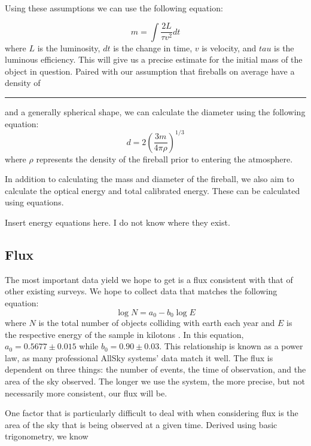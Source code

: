 Using these assumptions we can use the following equation:

\begin{equation}
m = \int \frac{2L}{\tau v^2} dt
\end{equation}
where $L$ is the luminosity, $dt$ is the change in time, $v$ is velocity, and $tau$ is the luminous efficiency.
This will give us a precise estimate for the initial mass of the object in question.
Paired with our assumption that fireballs on average have a density of \rule{1cm}{.1pt} and a generally spherical shape, we can calculate the diameter using the following equation:
\begin{equation}
d = 2(\frac{3m}{4\pi \rho})^{1/3}
\end{equation}
where $\rho$ represents the density of the fireball prior to entering the atmosphere.

In addition to calculating the mass and diameter of the fireball, we also aim to calculate the optical energy and total calibrated energy.
These can be calculated using equations.

Insert energy equations here.  I do not know where they exist.




\subsection{Flux}

The most important data yield we hope to get is a flux consistent with that of other existing surveys.
We hope to collect data that matches the following equation:
\begin{equation}
\log N = a_0 - b_0\log E 
\end{equation}
where $N$ is the total number of objects colliding with earth each year and $E$ is the respective energy of the sample in kilotons \cite{brown_p_flux_2002}.
In this equation, $a_0 = 0.5677 \pm 0.015$ while $b_0 = 0.90 \pm 0.03$.
This relationship is known as a power law, as many professional AllSky systems' data match it well.
The flux is dependent on three things: the number of events, the time of observation, and the area of the sky observed.
The longer we use the system, the more precise, but not necessarily more consistent, our flux will be. 

One factor that is particularly difficult to deal with when considering flux is the area of the sky that is being observed at a given time.
Derived using basic trigonometry, we know 

